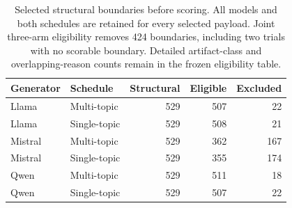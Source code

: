 \begin{table}[H]\centering\small
\begin{tabular}{llrrr}\toprule
Generator & Schedule & Structural & Eligible & Excluded \\ \midrule
Llama & Multi-topic & 529 & 507 & 22 \\
Llama & Single-topic & 529 & 508 & 21 \\
Mistral & Multi-topic & 529 & 362 & 167 \\
Mistral & Single-topic & 529 & 355 & 174 \\
Qwen & Multi-topic & 529 & 511 & 18 \\
Qwen & Single-topic & 529 & 507 & 22 \\
\bottomrule\end{tabular}
\caption{Selected structural boundaries before scoring. All models and both schedules are retained for every selected payload. Joint three-arm eligibility removes 424 boundaries, including two trials with no scorable boundary. Detailed artifact-class and overlapping-reason counts remain in the frozen eligibility table.}\label{tab:v4-boundary-eligibility}
\end{table}
